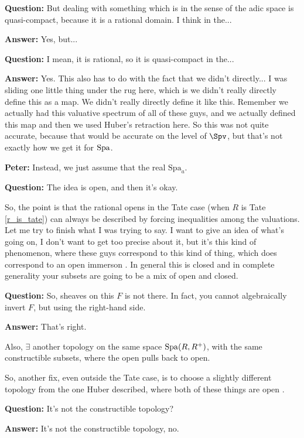 \begin{example}
\textbf{Question:} But dealing with something which is in the sense of the adic space is quasi-compact, because it is a rational domain. I think in the... 

\textbf{Answer:} Yes, but...

\textbf{Question:} I mean, it is rational, so it is quasi-compact in the...

\textbf{Answer:} Yes. This also has to do with the fact that we didn't directly... I was sliding one little thing under the rug here, which is we didn't really directly define this  as a map. We didn't really directly define it like this. Remember we actually had this valuative spectrum of all of these guys, and we actually defined this map and then we used Huber's retraction here. So this was not quite accurate, because that would be accurate on the level of $\Spv$, but that's not exactly how we get it for $\operatorname{Spa}$. 

\textbf{Peter:} Instead, we just assume that the real $\mathrm{Spa}_a$. 

\textbf{Question:} The idea is open, and then it's okay.

So, the point is that the rational opens in the Tate case (when $R$ is Tate \ref{r_is_tate}) can always be described by forcing inequalities among the valuations. Let me try to finish what I was trying to say. I want to give an idea of what's going on, I don't want to get too precise about it, but it's this kind of phenomenon, where these guys correspond to this kind of thing, which does correspond to an open immerson . In general this is closed and in complete generality your subsets are going to be a mix of open and closed.

\textbf{Question:} So, sheaves on this $F$ is not there. In fact, you cannot algebraically invert $F$, but using the right-hand side. 

\textbf{Answer:} That's right.

Also, $\exists$ another topology on the same space $\operatorname{Spa}(R, R^{+})$, with the same constructible subsets, where the open pulls back to open.

So, another fix, even outside the Tate case, is to choose a slightly different topology from the one Huber described, where both of these things are open . 

\textbf{Question:} It's not the constructible topology?

\textbf{Answer:} It's not the constructible topology, no. 


\end{example}
